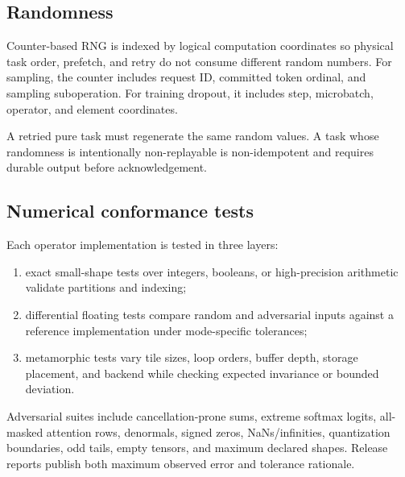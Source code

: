 \subsection{Randomness}

Counter-based RNG is indexed by logical computation coordinates so physical task order, prefetch, and retry do not consume different random numbers. For sampling, the counter includes request ID, committed token ordinal, and sampling suboperation. For training dropout, it includes step, microbatch, operator, and element coordinates.

A retried pure task must regenerate the same random values. A task whose randomness is intentionally non-replayable is non-idempotent and requires durable output before acknowledgement.

\subsection{Numerical conformance tests}

Each operator implementation is tested in three layers:

\begin{enumerate}
  \item exact small-shape tests over integers, booleans, or high-precision arithmetic validate partitions and indexing;
  \item differential floating tests compare random and adversarial inputs against a reference implementation under mode-specific tolerances;
  \item metamorphic tests vary tile sizes, loop orders, buffer depth, storage placement, and backend while checking expected invariance or bounded deviation.
\end{enumerate}

Adversarial suites include cancellation-prone sums, extreme softmax logits, all-masked attention rows, denormals, signed zeros, NaNs/infinities, quantization boundaries, odd tails, empty tensors, and maximum declared shapes. Release reports publish both maximum observed error and tolerance rationale.
